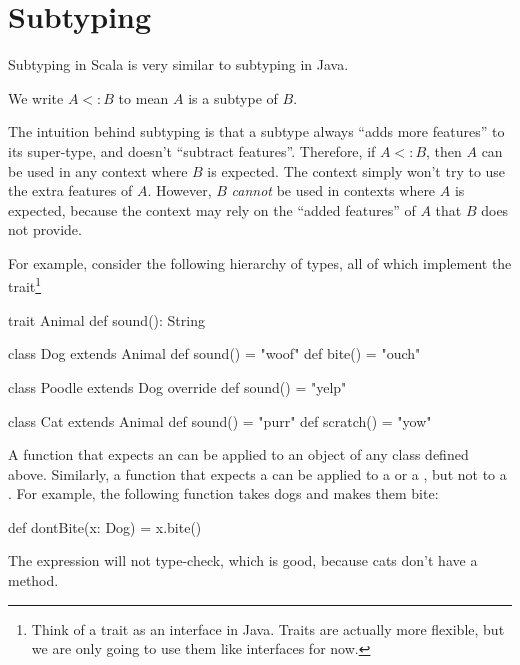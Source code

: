 \documentclass[9pt]{extbook}
\begin{document}
\section{Subtyping}

Subtyping in Scala is very similar to subtyping in Java.

\begin{notation}
We write $A <: B$ to mean $A$ is a subtype of $B$.
\end{notation}

The intuition behind subtyping is that a subtype always ``adds more features''
to its super-type, and doesn't ``subtract features''. Therefore, if $A <: B$,
then $A$ can be used in any context where $B$ is expected. The context simply
won't try to use the extra features of $A$. However, $B$ \emph{cannot}
be used in contexts where $A$ is expected, because the context may rely on
the ``added features'' of $A$ that $B$ does not provide.

For example, consider the following hierarchy of types, all of which
implement the  trait\footnote{Think of a trait as an interface in Java. Traits
are actually more flexible, but we are only going to use them like interfaces for now.}
%
\begin{scalacode}
trait Animal {
  def sound(): String
}

class Dog extends Animal {
  def sound() = "woof"
  def bite() = "ouch"
}

class Poodle extends Dog {
  override def sound() = "yelp"
}

class Cat extends Animal {
  def sound() = "purr"
  def scratch() = "yow"
}
\end{scalacode}

A function that expects an  can be applied to an object
of any class defined above. Similarly, a function that expects a 
can be applied to a  or a , but not to a
. For example, the following function takes dogs and makes
them bite:
\begin{scalacode}
def dontBite(x: Dog) = {
  x.bite()
}
\end{scalacode}

The expression  will not type-check, which
is good, because cats don't have a  method.
\end{document}
